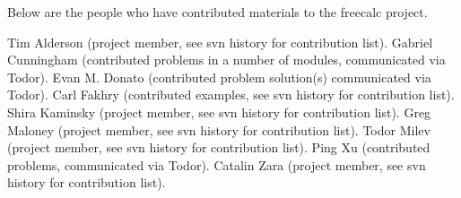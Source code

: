 Below are the people who have contributed materials to the freecalc project.

Tim Alderson (project member, see svn history for contribution list).
Gabriel Cunningham (contributed problems in a number of modules, communicated via Todor).
Evan M. Donato (contributed problem solution(s) communicated via Todor).
Carl Fakhry (contributed examples, see svn history for contribution list).
Shira Kaminsky (project member, see svn history for contribution list).
Greg Maloney (project member, see svn history for contribution list).
Todor Milev (project member, see svn history for contribution list).
Ping Xu (contributed problems, communicated via Todor).
Catalin Zara (project member, see svn history for contribution list).
